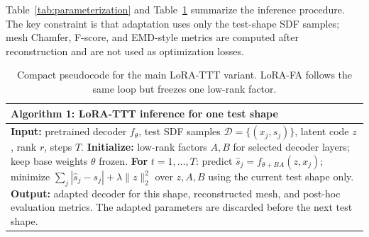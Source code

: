 \documentclass[letterpaper]{article}
\begin{document}
Table~\ref{tab:parameterization} and Table~\ref{alg:lora-ttt} summarize the inference procedure. The key constraint is that adaptation uses only the test-shape SDF samples; mesh Chamfer, F-score, and EMD-style metrics are computed after reconstruction and are not used as optimization losses.

\begin{table}[t]
\centering
\begin{small}
\setlength{\tabcolsep}{4pt}
\end{small}
\caption{Comparison of test-time parameterizations. All variants use the same per-shape SDF observations; mesh metrics are evaluated only after optimization.}
\label{tab:parameterization}
\end{table}

\begin{table}[t]
\centering
\begin{small}
\begin{tabular}{p{}}
\hline
\textbf{Algorithm 1: LoRA-TTT inference for one test shape} \\
\hline
\textbf{Input:} pretrained decoder $f_\theta$, test SDF samples $\mathcal{D}=\{(x_j,s_j)\}$, latent code $z$, rank $r$, steps $T$. \newline
\textbf{Initialize:} low-rank factors $A,B$ for selected decoder layers; keep base weights $\theta$ frozen. \newline
\textbf{For} $t=1,\ldots,T$: predict $\hat{s}_j=f_{\theta+BA}(z,x_j)$; minimize $\sum_j|\hat{s}_j-s_j|+\lambda\|z\|_2^2$ over $z,A,B$ using the current test shape only. \newline
\textbf{Output:} adapted decoder for this shape, reconstructed mesh, and post-hoc evaluation metrics. The adapted parameters are discarded before the next test shape. \\
\hline
\end{tabular}
\end{small}
\caption{Compact pseudocode for the main LoRA-TTT variant. LoRA-FA follows the same loop but freezes one low-rank factor.}
\label{alg:lora-ttt}
\end{table}
\end{document}
